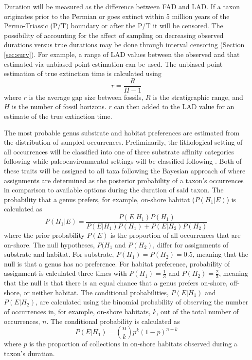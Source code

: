 \documentclass[12pt,letterpaper]{article}
\begin{document}
Duration will be measured as the difference between FAD and LAD. If a taxon originates prior to the Permian or goes extinct within 5 million years of the Permo-Triassic (P/T) boundary or after the P/T it will be censored. The possibility of accounting for the affect of sampling on decreasing observed durations versus true durations may be done through interval censoring (Section \ref{sec:surv}). For example, a range of LAD values between the observed and that estimated via unbiased point estimation \citep{Strauss1989,Alvarez1983a} can be used. The unbiased point estimation of true extinction time is calculated using
\begin{equation}
  r = \frac{R}{H - 1}
  \label{eq:stratest}
\end{equation}
where \(r\) is the average gap size between fossils, \(R\) is the stratigraphic range, and \(H\) is the number of fossil horizons. \(r\) can then added to the LAD value for an estimate of the true extinction time.

The most probable genus substrate and habitat preferences are estimated from the distribution of sampled occurrences. Preliminarily, the lithological setting of all occurrences will be classified into one of three substrate affinity categories following \citet{Foote2006} while paleoenvironmental settings will be classified following \citet{Kiessling2007}. Both of these traits will be assigned to all taxa following the Bayesian approach of \citet{Simpson2009} where assignments are determined as the posterior probability of a taxon's occurrences in comparison to available options during the duration of said taxon. The probability that a genus prefers, for example, on-shore habitat (\(P(H_{1}|E)\)) is calculated as
\begin{equation}
  P(H_{1}|E) = \frac{P(E|H_{1})P(H_{1})}{P(E|H_{1})P(H_{1}) + P(E|H_{2})P(H_{2})}
  \label{eq:aff}
\end{equation}
where the prior probability \(P(E)\) is the proportion of all occurrences that are on-shore. The null hypotheses, \(P(H_{1}\) and \(P(H_{2})\), differ for assignments of substrate and habitat. For substrate, \(P(H_{1}) = P(H_{2}) = 0.5\), meaning that the null is that a genus has no preference. For habitat preference, probability of assignment is calculated three times with \(P(H_{1}) = \frac{1}{3}\) and \(P(H_{2}) = \frac{2}{3}\), meaning that the null is that there is an equal chance that a genus prefers on-shore, off-shore, or neither habitat. The conditional probabilities, \(P(E|H_{1})\) and \(P(E|H_{2})\), are calculated using the binomial probability of observing the number of occurrences in, for example, on-shore habitats, \(k\), out of the total number of occurrences, \(n\). The conditional probability is calculated as
\begin{equation}
  P(E|H_{1}) = \binom{n}{k} p^{k}(1 - p)^{n - k}
  \label{eq:condprob}
\end{equation}
where \(p\) is the proportion of collections in on-shore habitats observed during a taxon's duration. 
\end{document}
